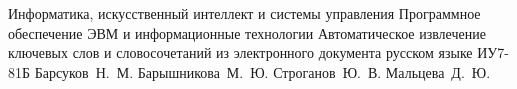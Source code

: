 \makethesistitle
{Информатика, искусственный интеллект и системы управления} %
{Программное обеспечение ЭВМ и информационные технологии} %
{Автоматическое извлечение ключевых слов и словосочетаний из электронного документа русском языке} %
{ИУ7-81Б} %
{Барсуков~Н.~М.} %
{Барышникова~М.~Ю.} %
{Строганов~Ю.~В.} %
{} %
{Мальцева~Д.~Ю.} %